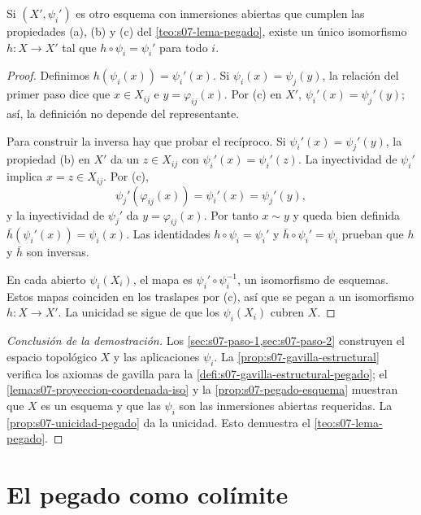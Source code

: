 \begin{prop}
\label{prop:s07-unicidad-pegado}
Si $(X',\psi_i')$ es otro esquema con inmersiones abiertas que cumplen las propiedades (a), (b) y (c) del \cref{teo:s07-lema-pegado}, existe un único isomorfismo $h\colon X\to X'$ tal que $h\circ\psi_i=\psi_i'$ para todo $i$.
\end{prop}
\begin{proof}
Definimos $h(\psi_i(x))=\psi_i'(x)$. Si $\psi_i(x)=\psi_j(y)$, la relación del primer paso dice que $x\in X_{ij}$ e $y=\varphi_{ij}(x)$. Por (c) en $X'$, $\psi_i'(x)=\psi_j'(y)$; así, la definición no depende del representante.

Para construir la inversa hay que probar el recíproco. Si $\psi_i'(x)=\psi_j'(y)$, la propiedad (b) en $X'$ da un $z\in X_{ij}$ con $\psi_i'(x)=\psi_i'(z)$. La inyectividad de $\psi_i'$ implica $x=z\in X_{ij}$. Por (c),
\[
\psi_j'(\varphi_{ij}(x))=\psi_i'(x)=\psi_j'(y),
\]
y la inyectividad de $\psi_j'$ da $y=\varphi_{ij}(x)$. Por tanto $x\sim y$ y queda bien definida $\bar h(\psi_i'(x))=\psi_i(x)$. Las identidades $h\circ\psi_i=\psi_i'$ y $\bar h\circ\psi_i'=\psi_i$ prueban que $h$ y $\bar h$ son inversas.

En cada abierto $\psi_i(X_i)$, el mapa es $\psi_i'\circ\psi_i^{-1}$, un isomorfismo de esquemas. Estos mapas coinciden en los traslapes por (c), así que se pegan a un isomorfismo $h\colon X\to X'$. La unicidad se sigue de que los $\psi_i(X_i)$ cubren $X$.
\end{proof}

\begin{proof}[Conclusión de la demostración]
Los \cref{sec:s07-paso-1,sec:s07-paso-2} construyen el espacio topológico $X$ y las aplicaciones $\psi_i$. La \cref{prop:s07-gavilla-estructural} verifica los axiomas de gavilla para la \cref{defi:s07-gavilla-estructural-pegado}; el \cref{lema:s07-proyeccion-coordenada-iso} y la \cref{prop:s07-pegado-esquema} muestran que $X$ es un esquema y que las $\psi_i$ son las inmersiones abiertas requeridas. La \cref{prop:s07-unicidad-pegado} da la unicidad. Esto demuestra el \cref{teo:s07-lema-pegado}.
\end{proof}

\section{El pegado como colímite}


